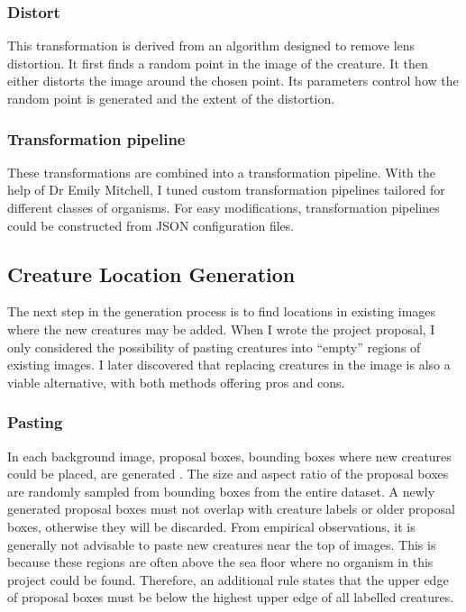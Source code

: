 \documentclass[12pt,a4paper,twoside,openright]{report}
\begin{document}
\subsubsection{Distort}
This transformation is derived from an algorithm designed to remove lens distortion. It first finds a random point in the image of the creature. It then either distorts the image around the chosen point. Its parameters control how the random point is generated and the extent of the distortion.

\subsubsection{Transformation pipeline}
These transformations are combined into a transformation pipeline. With the help of Dr Emily Mitchell, I tuned custom transformation pipelines tailored for different classes of organisms. For easy modifications, transformation pipelines could be constructed from JSON configuration files.


\subsection{Creature Location Generation}
The next step in the generation process is to find locations in existing images where the new creatures may be added. When I wrote the project proposal, I only considered the possibility of pasting creatures into ``empty'' regions of existing images. I later discovered that replacing creatures in the image is also a viable alternative, with both methods offering pros and cons.

\subsubsection{Pasting}
In each background image, proposal boxes, bounding boxes where new creatures could be placed, are generated . The size and aspect ratio of the proposal boxes are randomly sampled from bounding boxes from the entire dataset. A newly generated proposal boxes must not overlap with creature labels or older proposal boxes, otherwise they will be discarded. From empirical observations, it is generally not advisable to paste new creatures near the top of images. This is because these regions are often above the sea floor where no organism in this project could be found. Therefore, an additional rule states that the upper edge of proposal boxes must be below the highest upper edge of all labelled creatures.
\end{document}

